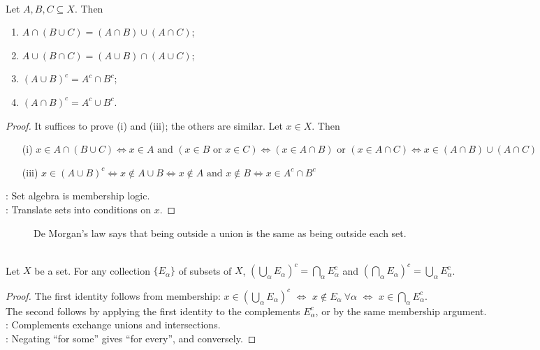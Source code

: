 \begin{proposition} \label{prop:analysis-set-algebra} \\
Let $A,B,C\subseteq X$. Then
\begin{enumerate}[label=(\roman*)]
\setlength{\itemsep}{0pt}
\item $A\cap(B\cup C)=(A\cap B)\cup(A\cap C)$;
\item $A\cup(B\cap C)=(A\cup B)\cap(A\cup C)$;
\item $(A\cup B)^c=A^c\cap B^c$;
\item $(A\cap B)^c=A^c\cup B^c$.
\end{enumerate}
\begin{proof}
It suffices to prove (i) and (iii); the others are similar. Let $x\in X$. Then
\begin{enumerate}[label=(\roman*)]
\setlength{\itemsep}{0pt}
\item[(i)] $x\in A\cap(B\cup C) \Longleftrightarrow x\in A \text{ and } (x\in B \text{ or } x\in C) \Longleftrightarrow (x\in A\cap B) \text{ or } (x\in A\cap C) \Longleftrightarrow x\in (A\cap B)\cup(A\cap C)$
\item[(iii)] $x\in (A\cup B)^c \Longleftrightarrow x\notin A\cup B \Longleftrightarrow x\notin A \text{ and } x\notin B \Longleftrightarrow x\in A^c\cap B^c$
\end{enumerate}
: Set algebra is membership logic.\\
: Translate sets into conditions on $x$.
\end{proof}
\end{proposition}

\begin{figure}[H]
    \centering
    
    \caption{De Morgan's law says that being outside a union is the same as being outside each set.}
    \label{fig:de-morgan-complement-union}
\end{figure}

\begin{theorem} \label{thm:metric-de-morgan-laws} \\
Let $X$ be a set. For any collection $\{E_\alpha\}$ of subsets of $X$, $\left(\bigcup\limits_\alpha E_\alpha\right)^c=\bigcap\limits_\alpha E_\alpha^c$ and $\left(\bigcap\limits_\alpha E_\alpha\right)^c=\bigcup\limits_\alpha E_\alpha^c$.
\begin{proof}
The first identity follows from membership: $x\in\left(\bigcup\limits_\alpha E_\alpha\right)^c$ $\Longleftrightarrow$ $x\notin E_\alpha \ \forall \alpha$ $\Longleftrightarrow$ $x\in\bigcap\limits_\alpha E_\alpha^c$.\\
The second follows by applying the first identity to the complements $E_\alpha^c$, or by the same membership argument.\\
: Complements exchange unions and intersections.\\
: Negating ``for some'' gives ``for every'', and conversely.
\end{proof}
\end{theorem}

